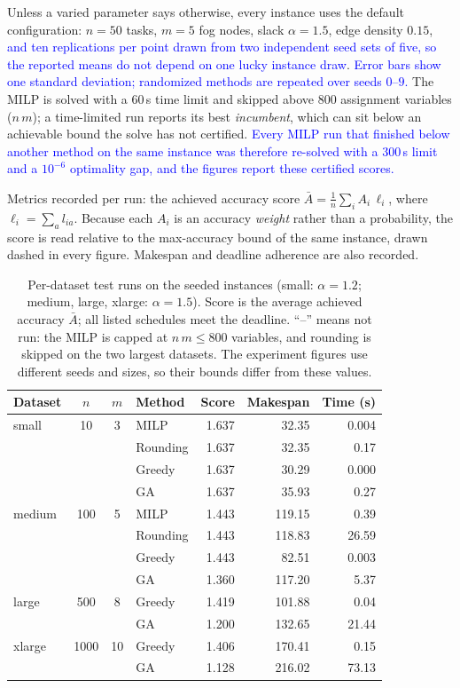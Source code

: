 \documentclass[conference]{IEEEtran}
\newcommand{\rev}[1]{\textcolor{blue}{#1}}%
\begin{document}
Unless a varied parameter says otherwise, every instance uses the default configuration: $n{=}50$ tasks, $m{=}5$ fog nodes, slack $\alpha=1.5$, edge density $0.15$, \rev{and ten replications per point drawn from two independent seed sets of five, so the reported means do not depend on one lucky instance draw}. \rev{Error bars show one standard deviation; randomized methods are repeated over seeds $0$--$9$.} The MILP is solved with a 60\,s time limit and skipped above 800 assignment variables ($n\,m$); a time-limited run reports its best \emph{incumbent}, which can sit below an achievable bound the solve has not certified. \rev{Every MILP run that finished below another method on the same instance was therefore re-solved with a 300\,s limit and a $10^{-6}$ optimality gap, and the figures report these certified scores.}

Metrics recorded per run: the achieved accuracy score $\bar{A}=\frac{1}{n}\sum_i A_i\,\ell_i$, where $\ell_i=\sum_a l_{ia}$. Because each $A_i$ is an accuracy \emph{weight} rather than a probability, the score is read relative to the max-accuracy bound of the same instance, drawn dashed in every figure. Makespan and deadline adherence are also recorded.

\begin{table}[t]
\centering
\caption{Per-dataset test runs on the seeded instances (small: $\alpha{=}1.2$;
medium, large, xlarge: $\alpha{=}1.5$). Score is the average achieved accuracy
$\bar{A}$; all listed schedules meet the deadline. ``--'' means not run:
the MILP is capped at $n\,m\le 800$ variables, and rounding is skipped on the
two largest datasets. The experiment figures use different seeds and sizes,
so their bounds differ from these values.}
\label{tab:runs}
\footnotesize
\setlength{\tabcolsep}{4pt}
\begin{tabular}{@{}lcclrrr@{}}
\toprule
Dataset & $n$ & $m$ & Method & Score & Makespan & Time (s) \\
\midrule
small  & 10   & 3  & MILP      & 1.637 & 32.35 & 0.004 \\
       &      &    & Rounding  & 1.637 & 32.35 & 0.17  \\
       &      &    & Greedy    & 1.637 & 30.29 & 0.000 \\
       &      &    & GA        & 1.637 & 35.93 & 0.27  \\
\midrule
medium & 100  & 5  & MILP      & 1.443 & 119.15 & 0.39  \\
       &      &    & Rounding  & 1.443 & 118.83 & 26.59 \\
       &      &    & Greedy    & 1.443 & 82.51 & 0.003 \\
       &      &    & GA        & 1.360 & 117.20 & 5.37  \\
\midrule
large  & 500  & 8  & Greedy    & 1.419 & 101.88 & 0.04  \\
       &      &    & GA        & 1.200 & 132.65 & 21.44 \\
\midrule
xlarge & 1000 & 10 & Greedy    & 1.406 & 170.41 & 0.15  \\
       &      &    & GA        & 1.128 & 216.02 & 73.13 \\
\bottomrule
\end{tabular}
\end{table}
\end{document}
